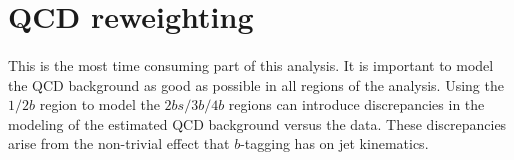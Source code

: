 
\section{QCD reweighting}
\label{sec:boosted-reweight}

\paragraph{}
This is the most time consuming part of this analysis.
It is important to model the QCD background as good as possible in all regions of the analysis.
Using the $1/2b$ region to model the $2bs/3b/4b$ regions can introduce discrepancies in the modeling of the estimated QCD background versus the data. 
These discrepancies arise from the non-trivial effect that $b$-tagging has on jet kinematics.

